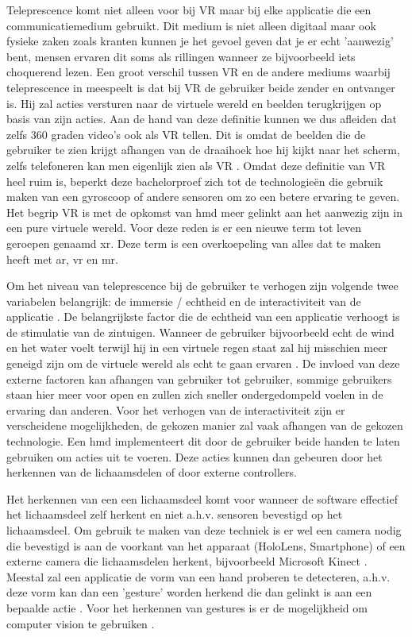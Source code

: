 Teleprescence komt niet alleen voor bij VR maar bij elke applicatie die een communicatiemedium gebruikt. Dit medium is niet alleen digitaal maar ook fysieke zaken zoals kranten kunnen je het gevoel geven dat je er echt 'aanwezig' bent, mensen ervaren dit soms als rillingen wanneer ze bijvoorbeeld iets choquerend lezen. 
Een groot verschil tussen VR en de andere mediums waarbij teleprescence in meespeelt is dat bij VR de gebruiker beide zender en ontvanger is. Hij zal acties versturen naar de virtuele wereld en beelden terugkrijgen op basis van zijn acties.
Aan de hand van deze definitie kunnen we dus afleiden dat zelfs 360 graden video's ook als VR tellen. Dit is omdat de beelden die de gebruiker te zien krijgt afhangen van de draaihoek hoe hij kijkt naar het scherm, zelfs telefoneren kan men eigenlijk zien als VR \autocite{Steuer1992}.
Omdat deze definitie van VR heel ruim is, beperkt deze bachelorproef zich tot de technologieën die gebruik maken van een gyroscoop of andere sensoren om zo een betere ervaring te geven. Het begrip VR is met de opkomst van \acrfull{hmd} meer gelinkt aan het aanwezig zijn in een pure virtuele wereld. Voor deze reden is er een nieuwe term tot leven geroepen genaamd \acrfull{xr}. Deze term is een overkoepeling van alles dat te maken heeft met \acrlong{ar}, \acrlong{vr} en \acrlong{mr}.

Om het niveau van teleprescence bij de gebruiker te verhogen zijn volgende twee variabelen belangrijk: de immersie / echtheid en de interactiviteit van de applicatie \autocite{Steuer1992}.
De belangrijkste factor die de echtheid van een applicatie verhoogt is de stimulatie van de zintuigen. Wanneer de gebruiker bijvoorbeeld echt de wind en het water voelt terwijl hij in een virtuele regen staat zal hij misschien meer geneigd zijn om de virtuele wereld als echt te gaan ervaren \autocite{Steuer1992}. De invloed van deze externe factoren kan afhangen van gebruiker tot gebruiker, sommige gebruikers staan hier meer voor open en zullen zich sneller ondergedompeld voelen in de ervaring dan anderen.
Voor het verhogen van de interactiviteit zijn er verscheidene mogelijkheden, de gekozen manier zal vaak afhangen van de gekozen technologie. Een \acrshort{hmd} implementeert dit door de gebruiker beide handen te laten gebruiken om acties uit te voeren. Deze acties kunnen dan gebeuren door het herkennen van de lichaamsdelen of door externe controllers.

Het herkennen van een een lichaamsdeel komt voor wanneer de software effectief het lichaamsdeel zelf herkent en niet a.h.v. sensoren bevestigd op het lichaamsdeel. Om gebruik te maken van deze techniek is er wel een camera nodig die bevestigd is aan de voorkant van het apparaat (HoloLens, Smartphone) of een externe camera die lichaamsdelen herkent, bijvoorbeeld Microsoft Kinect \autocite{Ren2013}.
Meestal zal een applicatie de vorm van een hand proberen te detecteren, a.h.v. deze vorm kan dan een 'gesture' worden herkend die dan gelinkt is aan een bepaalde actie \autocite{Piumsomboon2013}. 
Voor het herkennen van gestures is er de mogelijkheid om computer vision te gebruiken \autocite{Ji2013}.


